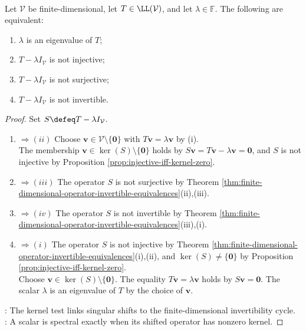 \begin{theorem} \label{thm:equivalent-eigenvalue-conditions} \\
Let $\mathcal{V}$ be finite-dimensional, let $T\in\LL(\mathcal{V})$, and let $\lambda\in\mathbb{F}$. The following are equivalent:
\begin{enumerate}[label=(\roman*)]
\setlength{\itemsep}{0pt}
\item $\lambda$ is an eigenvalue of $T$;
\item $T-\lambda I_{\mathcal{V}}$ is not injective;
\item $T-\lambda I_{\mathcal{V}}$ is not surjective;
\item $T-\lambda I_{\mathcal{V}}$ is not invertible.
\end{enumerate}
\begin{proof}
Set $S\defeq T-\lambda I_{\mathcal{V}}$.
\begin{enumerate}[label=(\roman*)]
\setlength{\itemsep}{0pt}
\item[$(i)$] $\Rightarrow (ii)$ Choose $\mathbf{v}\in\mathcal{V}\setminus\{\mathbf{0}\}$ with $T\mathbf{v}=\lambda\mathbf{v}$ by (i).\\
The membership $\mathbf{v}\in\ker(S)\setminus\{\mathbf{0}\}$ holds by $S\mathbf{v}=T\mathbf{v}-\lambda\mathbf{v}=\mathbf{0}$, and $S$ is not injective by Proposition \ref{prop:injective-iff-kernel-zero}.
\item[$(ii)$] $\Rightarrow (iii)$ The operator $S$ is not surjective by Theorem \ref{thm:finite-dimensional-operator-invertible-equivalences}(ii),(iii).
\item[$(iii)$] $\Rightarrow (iv)$ The operator $S$ is not invertible by Theorem \ref{thm:finite-dimensional-operator-invertible-equivalences}(iii),(i).
\item[$(iv)$] $\Rightarrow (i)$ The operator $S$ is not injective by Theorem \ref{thm:finite-dimensional-operator-invertible-equivalences}(i),(ii), and $\ker(S)\neq\{\mathbf{0}\}$ by Proposition \ref{prop:injective-iff-kernel-zero}.\\
Choose $\mathbf{v}\in\ker(S)\setminus\{\mathbf{0}\}$. The equality $T\mathbf{v}=\lambda\mathbf{v}$ holds by $S\mathbf{v}=\mathbf{0}$. The scalar $\lambda$ is an eigenvalue of $T$ by the choice of $\mathbf{v}$.
\end{enumerate}
: The kernel test links singular shifts to the finite-dimensional invertibility cycle.\\
: A scalar is spectral exactly when its shifted operator has nonzero kernel.
\end{proof}
\end{theorem}

